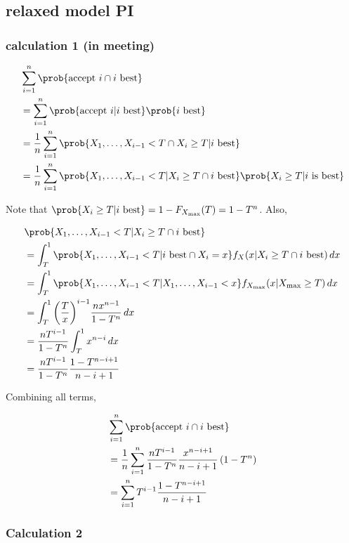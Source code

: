 \subsection{relaxed model PI}
\subsubsection{calculation 1 (in meeting)}

\begin{align*}
&\sum_{i=1}^n \prob{\text{accept }i \cap i \text{ best}}\\
&= \sum_{i=1}^n \prob{\text{accept }i | i \text{ best}}\prob{i \text{ best}}\\
&= \frac{1}{n}\sum_{i=1}^n \prob{X_1,\dots,X_{i-1}<T \cap X_i \geq T | i \text{ best}}\\
&= \frac{1}{n}\sum_{i=1}^n \prob{X_1,\dots,X_{i-1}<T | X_i \geq T \cap i \text{ best}}\prob{X_i \geq T | i\text{ is best}}\\ 
\end{align*}

Note that $\prob{X_i \geq T | i \text{ best}} = 1-F_{X_{\max}}(T) = 1-T^n$. Also,

\begin{align*}
&\prob{X_1,\dots,X_{i-1}<T | X_i \geq T \cap i \text{ best}}\\
&= \int_{T}^1 \prob{X_1,\dots,X_{i-1}<T | i \text{ best} \cap X_i = x}f_{X}(x | X_i \geq T \cap i \text{ best})\,dx\\
&= \int_{T}^1 \prob{X_1,\dots,X_{i-1}<T | X_1,\dots,X_{i-1}<x}f_{X_{\max}}(x | X_{\max}\geq T)\,dx\\
&= \int_{T}^1 {\left(\frac{T}{x}\right)}^{i-1} \frac{nx^{n-1}}{1-T^{n}} \,dx\\
&= \frac{nT^{i-1}}{1-T^{n}}\int_{T}^1  x^{n-i} \,dx\\
&= \frac{nT^{i-1}}{1-T^{n}} \frac{1-T^{n-i+1}}{n-i+1}
\end{align*}

Combining all terms,

\begin{align*}
&\sum_{i=1}^n \prob{\text{accept }i \cap i \text{ best}}\\
&=\frac{1}{n}\sum_{i=1}^n \frac{nT^{i-1}}{1-T^{n}} \frac{x^{n-i+1}}{n-i+1} \left(1-T^n\right)\\
&=\sum_{i=1}^n T^{i-1} \frac{1-T^{n-i+1}}{n-i+1}\\
\end{align*}
\subsubsection{Calculation 2}

